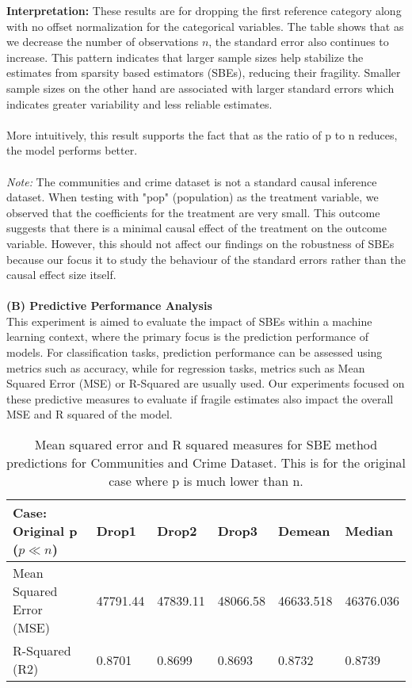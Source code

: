\textbf{Interpretation:} These results are for dropping the first reference category along with no offset normalization for the categorical variables. The table shows that as we decrease the number of observations $n$, the standard error also continues to increase. This pattern indicates that larger sample sizes help stabilize the estimates from sparsity based estimators (SBEs), reducing their fragility. Smaller sample sizes on the other hand are associated with larger standard errors which indicates greater variability and less reliable estimates. \\
\\
More intuitively, this result supports the fact that as the ratio of p to n reduces, the model performs better.\\
\\
\textit{Note:} The communities and crime dataset is not a standard causal inference dataset. When testing with "pop" (population) as the treatment variable, we observed that the coefficients for the treatment are very small. This outcome suggests that there is a minimal causal effect of the treatment on the outcome variable. However, this should not affect our findings on the robustness of SBEs because our focus it to study the behaviour of the standard errors rather than the causal effect size itself.\\
\\
\textbf{(B) Predictive Performance Analysis }\\
This experiment is aimed to evaluate the impact of SBEs within a machine learning context, where the primary focus is the prediction performance of models. For classification tasks, prediction performance can be assessed using metrics such as accuracy, while for regression tasks, metrics such as Mean Squared Error (MSE) or R-Squared are usually used. Our experiments focused on these predictive measures to evaluate if fragile estimates also impact the overall MSE and R squared of the model.
\begin{table}[h!]
\renewcommand{\arraystretch}{1.5}
\centering
\begin{tabular}{||l l l l l l||} 
 \hline
 \hline
 Case: Original p ($p \ll n$) & Drop1 & Drop2 & Drop3 & Demean & Median \\ [0.5ex] 
 \hline \hline
 Mean Squared Error (MSE) & 47791.44 & 47839.11 & 48066.58 & 46633.518 & 46376.036 \\ 
 R-Squared (R2) & 0.8701 & 0.8699 & 0.8693 & 0.8732 & 0.8739 \\
 \hline \hline
\end{tabular}
\caption{Mean squared error and R squared measures for SBE method predictions for Communities and Crime Dataset. This is for the original case where p is much lower than n.}
\label{table:1}
\end{table}



